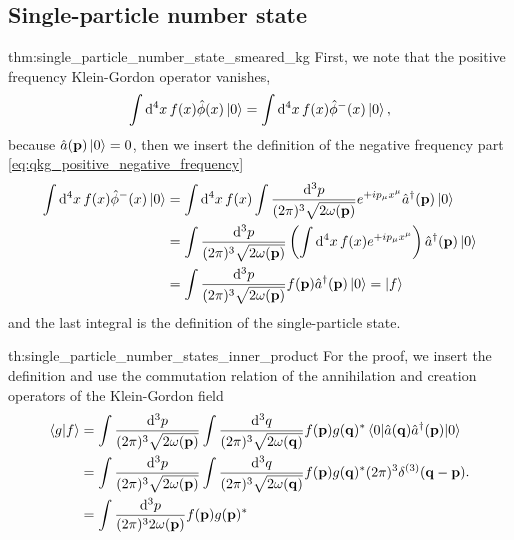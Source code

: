 \subsection{Single-particle number state}

\begin{delayedproof}{thm:single_particle_number_state_smeared_kg}
	First, we note that the positive frequency Klein-Gordon operator vanishes,
	\begin{equation}
		\int\dd[4]{x}
		f(x)
		\hat\phi(x)
		\ket{0}
		=
		\int\dd[4]{x}
		f(x)
		\hat\phi^-(x)
		\ket{0}
		,
	\end{equation}
	because $\hat{a}(\vb{p})\ket{0}=0$, then we insert the definition of the negative frequency part \cref{eq:qkg_positive_negative_frequency}
	\begin{equation}
		\begin{split}
			\int\dd[4]{x}
			f(x)
			\hat\phi^-(x)
			\ket{0}
			&=
			\int\dd[4]{x}
			f(x)
			\int\frac{\dd[3]{p}}{(2\pi)^3\sqrt{2\omega(\vb{p})}}
			e^{+ip_\mu x^\mu}
			\hat{a}^\dagger(\vb{p})
			\ket{0}
			\\
			&=
			\int\frac{\dd[3]{p}}{(2\pi)^3\sqrt{2\omega(\vb{p})}}
			\left(
				\int\dd[4]{x}
				f(x)
				e^{+ip_\mu x^\mu}
			\right)
			\hat{a}^\dagger(\vb{p})
			\ket{0}
			\\
			&=
			\int\frac{\dd[3]{p}}{(2\pi)^3\sqrt{2\omega(\vb{p})}}
			f(\vb{p})
			\hat{a}^\dagger(\vb{p})
			\ket{0}
			=
			\ket{f}
		\end{split}
	\end{equation}
	and the last integral is the definition of the single-particle state.
\end{delayedproof}
\begin{delayedproof}{th:single_particle_number_states_inner_product}
	For the proof, we insert the definition and use the commutation relation of the annihilation and creation operators of the Klein-Gordon field
	\begin{equation}
		\begin{split}
			\bra{g}\ket{f}
			&=
			\int\frac{\dd[3]{p}}{(2\pi)^3\sqrt{2\omega(\vb{p})}}
			\int\frac{\dd[3]{q}}{(2\pi)^3\sqrt{2\omega(\vb{q})}}
			f(\vb{p})g(\vb{q})^*
			\expval{\hat{a}(\vb{q})\hat{a}^\dagger(\vb{p})}{0}
			\\
			&=
			\int\frac{\dd[3]{p}}{(2\pi)^3\sqrt{2\omega(\vb{p})}}
			\int\frac{\dd[3]{q}}{(2\pi)^3\sqrt{2\omega(\vb{q})}}
			f(\vb{p})g(\vb{q})^*
			(2\pi)^3\delta^{(3)}(\vb{q}-\vb{p})
			\\
			&=
			\int\frac{\dd[3]{p}}{(2\pi)^32\omega(\vb{p})}
			f(\vb{p})g(\vb{p})^*
		\end{split}
		.
	\end{equation}
\end{delayedproof}
